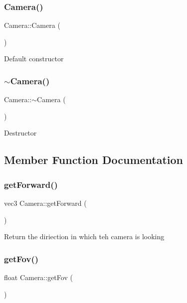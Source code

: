 \subsubsection{\texorpdfstring{Camera()}{Camera()}\hspace{0.1cm}{\footnotesize\ttfamily [2/2]}}
{\footnotesize\ttfamily Camera\+::\+Camera (\begin{DoxyParamCaption}{ }\end{DoxyParamCaption})}

Default constructor \mbox{\label{classCamera_ad1897942d0ccf91052386388a497349f}} 
\subsubsection{\texorpdfstring{$\sim$\+Camera()}{~Camera()}}
{\footnotesize\ttfamily Camera\+::$\sim$\+Camera (\begin{DoxyParamCaption}{ }\end{DoxyParamCaption})}

Destructor 

\subsection{Member Function Documentation}
\mbox{\label{classCamera_a530fa6698a43a61be7a78d60dddb45c2}} 
\subsubsection{\texorpdfstring{get\+Forward()}{getForward()}}
{\footnotesize\ttfamily vec3 Camera\+::get\+Forward (\begin{DoxyParamCaption}{ }\end{DoxyParamCaption})}

Return the diriection in which teh camera is looking \mbox{\label{classCamera_a71e957327f96cd913cd1ecd7d42c35e3}} 
\subsubsection{\texorpdfstring{get\+Fov()}{getFov()}}
{\footnotesize\ttfamily float Camera\+::get\+Fov (\begin{DoxyParamCaption}{ }\end{DoxyParamCaption})}

